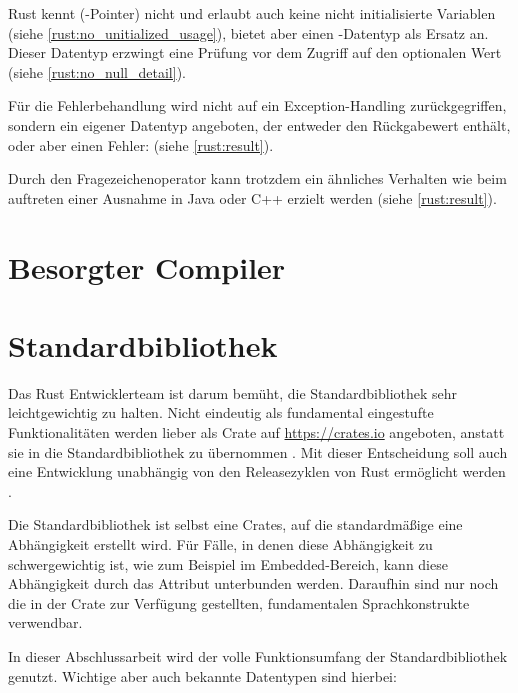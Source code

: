 Rust kennt (-Pointer) nicht und erlaubt auch keine nicht initialisierte Variablen (siehe \autoref{rust:no_unitialized_usage}), bietet aber einen -Datentyp als Ersatz an.
Dieser Datentyp erzwingt eine Prüfung vor dem Zugriff auf den optionalen Wert (siehe \autoref{rust:no_null_detail}).

Für die Fehlerbehandlung wird nicht auf ein Exception-Handling zurückgegriffen, sondern ein eigener Datentyp angeboten, der entweder den Rückgabewert enthält, oder aber einen Fehler:  (siehe \autoref{rust:result}).

Durch den Fragezeichenoperator kann trotzdem ein ähnliches Verhalten wie beim auftreten einer Ausnahme in Java oder C++ erzielt werden (siehe \autoref{rust:result}).


\section{Besorgter Compiler}
\label{rust:worried_compiler}



\section{Standardbibliothek}
\label{rust:stdlib}

Das Rust Entwicklerteam ist darum bemüht, die Standardbibliothek sehr leichtgewichtig zu halten.
Nicht eindeutig als fundamental eingestufte Funktionalitäten werden lieber als Crate auf \url{https://crates.io} angeboten, anstatt sie in die Standardbibliothek zu übernommen . 
Mit dieser Entscheidung soll auch eine Entwicklung unabhängig von den Releasezyklen von Rust ermöglicht werden .

Die Standardbibliothek ist selbst eine Crates, auf die standardmäßige eine Abhängigkeit erstellt wird.
Für Fälle, in denen diese Abhängigkeit zu schwergewichtig ist, wie zum Beispiel im Embedded-Bereich, kann diese Abhängigkeit durch das Attribut \rustcinline{#![no_std]} unterbunden werden.
Daraufhin sind nur noch die in der  Crate zur Verfügung gestellten, fundamentalen Sprachkonstrukte verwendbar.

In dieser Abschlussarbeit wird der volle Funktionsumfang der Standardbibliothek genutzt.
Wichtige aber auch bekannte Datentypen sind hierbei:

